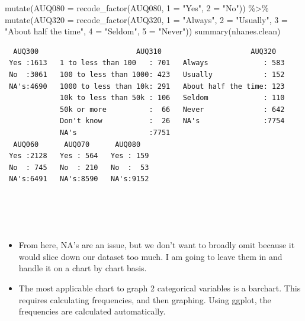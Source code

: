 \documentclass[
  letterpaper,
  DIV=11,
  numbers=noendperiod]{scrreprt}
\newenvironment{Shaded}{\begin{snugshade}}{\end{snugshade}}
\newcommand{\AttributeTok}[1]{\textcolor[rgb]{0.40,0.45,0.13}{#1}}
\newcommand{\FunctionTok}[1]{\textcolor[rgb]{0.28,0.35,0.67}{#1}}
\newcommand{\NormalTok}[1]{\textcolor[rgb]{0.00,0.23,0.31}{#1}}
\newcommand{\OtherTok}[1]{\textcolor[rgb]{0.00,0.23,0.31}{#1}}
\newcommand{\SpecialCharTok}[1]{\textcolor[rgb]{0.37,0.37,0.37}{#1}}
\newcommand{\StringTok}[1]{\textcolor[rgb]{0.13,0.47,0.30}{#1}}
\providecommand{\tightlist}{%
  \setlength{\itemsep}{0pt}\setlength{\parskip}{0pt}}\usepackage{longtable,booktabs,array}
\begin{document}
\begin{Shaded}
\begin{Highlighting}[]
    \FunctionTok{mutate}\NormalTok{(}\AttributeTok{AUQ080 =} \FunctionTok{recode\_factor}\NormalTok{(AUQ080, }\StringTok{\textasciigrave{}}\AttributeTok{1}\StringTok{\textasciigrave{}} \OtherTok{=} \StringTok{"Yes"}\NormalTok{, }\StringTok{\textasciigrave{}}\AttributeTok{2}\StringTok{\textasciigrave{}} \OtherTok{=} \StringTok{"No"}\NormalTok{)) }\SpecialCharTok{\%\textgreater{}\%}
    \FunctionTok{mutate}\NormalTok{(}\AttributeTok{AUQ320 =} \FunctionTok{recode\_factor}\NormalTok{(AUQ320, }\StringTok{\textasciigrave{}}\AttributeTok{1}\StringTok{\textasciigrave{}} \OtherTok{=} \StringTok{"Always"}\NormalTok{, }\StringTok{\textasciigrave{}}\AttributeTok{2}\StringTok{\textasciigrave{}} \OtherTok{=} \StringTok{"Usually"}\NormalTok{,}
        \StringTok{\textasciigrave{}}\AttributeTok{3}\StringTok{\textasciigrave{}} \OtherTok{=} \StringTok{"About half the time"}\NormalTok{, }\StringTok{\textasciigrave{}}\AttributeTok{4}\StringTok{\textasciigrave{}} \OtherTok{=} \StringTok{"Seldom"}\NormalTok{, }\StringTok{\textasciigrave{}}\AttributeTok{5}\StringTok{\textasciigrave{}} \OtherTok{=} \StringTok{"Never"}\NormalTok{))}
\FunctionTok{summary}\NormalTok{(nhanes.clean)}
\end{Highlighting}
\end{Shaded}

\begin{verbatim}
  AUQ300                       AUQ310                     AUQ320    
 Yes :1613   1 to less than 100   : 701   Always             : 583  
 No  :3061   100 to less than 1000: 423   Usually            : 152  
 NA's:4690   1000 to less than 10k: 291   About half the time: 123  
             10k to less than 50k : 106   Seldom             : 110  
             50k or more          :  66   Never              : 642  
             Don't know           :  26   NA's               :7754  
             NA's                 :7751                             
  AUQ060      AUQ070      AUQ080    
 Yes :2128   Yes : 564   Yes : 159  
 No  : 745   No  : 210   No  :  53  
 NA's:6491   NA's:8590   NA's:9152  
                                    
                                    
                                    
                                    
\end{verbatim}

\begin{itemize}
\tightlist
\item
  From here, NA's are an issue, but we don't want to broadly omit
  because it would slice down our dataset too much. I am going to leave
  them in and handle it on a chart by chart basis.
\item
  The most applicable chart to graph 2 categorical variables is a
  barchart. This requires calculating frequencies, and then graphing.
  Using ggplot, the frequencies are calculated automatically.
\end{itemize}
\end{document}
